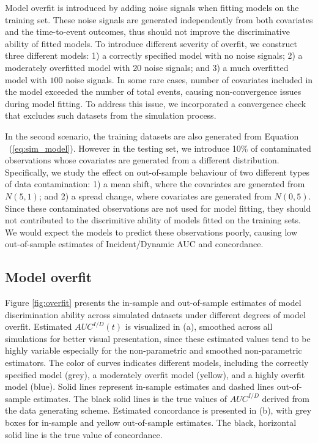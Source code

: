 \documentclass[useAMS,usenatbib, referee]{biom}
\begin{document}
Model overfit is introduced by adding noise signals when fitting models on the training set. These noise signals are generated independently from both covariates and the time-to-event outcomes, thus should not improve the discriminative ability of fitted models. To introduce different severity of overfit, we construct three different models: 1) a correctly specified model with no noise signals; 2) a moderately overfitted model with $20$ noise signals; and 3) a much overfitted model with $100$ noise signals. In some rare cases, number of covariates included in the model exceeded the number of total events, causing non-convergence issues during model fitting. To address this issue, we incorporated a convergence check that excludes such datasets from the simulation process. 

In the second scenario, the training datasets are also generated from Equation ~(\ref{eq:sim_model}). However in the testing set, we introduce 10\% of contaminated observations whose covariates are generated from a different distribution. Specifically, we study the effect on out-of-sample behaviour of two different types of data contamination: 1) a mean shift, where the covariates are generated from $N(5, 1)$; and 2) a spread change, where covariates are generated from $N(0, 5)$. Since these contaminated observations are not used for model fitting, they should not contributed to the discrimitive ability of models fitted on the training sets. We would expect the models to predict these observations poorly, causing low out-of-sample estimates of Incident/Dynamic AUC and concordance.


\subsection{Model overfit}
\label{sec:sim_overfit}

Figure \ref{fig:overfit} presents the in-sample and out-of-sample estimates of model discrimination ability across simulated datasets under different degrees of model overfit. Estimated $AUC^{I/D}(t)$ is visualized in (a), smoothed across all simulations for better visual presentation, since these estimated values tend to be highly variable especially for the non-parametric and smoothed non-parametric estimators. The color of curves indicates different models, including the correctly specified model (grey), a moderately overfit model (yellow), and a highly overfit model (blue).
Solid lines represent in-sample estimates and dashed lines out-of-sample estimates. The black solid lines is the true values of $AUC^{I/D}$ derived from the data generating scheme. Estimated concordance is presented in (b), with grey boxes for in-sample and yellow out-of-sample estimates. The black, horizontal solid line is the true value of concordance. 
\end{document}
